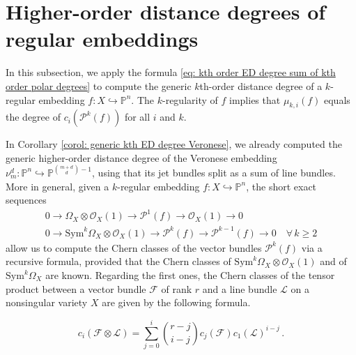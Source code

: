 \documentclass[11pt,reqno]{amsart}
\numberwithin{equation}{section}
\theoremstyle{plain}
\numberwithin{theorem}{section}
\theoremstyle{definition}
\renewcommand{\P}{\mathbb{P}}
\newcommand{\LL}{\mathcal{L}}
\newcommand{\FF}{\mathcal{F}}
\newcommand{\OO}{\mathcal{O}}
\newcommand{\PP}{\mathcal{P}}
\begin{document}
\section{Higher-order distance degrees of regular embeddings}\label{sec: formulas for k-regular embeddings}

In this subsection, we apply the formula \eqref{eq: kth order ED degree sum of kth order polar degrees} to compute the generic $k$th-order distance degree of a $k$-regular embedding $f\colon X\hookrightarrow\P^n$. The $k$-regularity of $f$ implies that $\mu_{k,i}(f)$ equals the degree of $c_i(\PP^k(f))$ for all $i$ and $k$.

In Corollary \ref{corol: generic kth ED degree Veronese}, we already computed the generic higher-order distance degree of the Veronese embedding $\nu_m^d\colon\P^n\hookrightarrow\P^{\binom{m+d}{d}-1}$, using that its jet bundles split as a sum of line bundles. More in general, given a $k$-regular embedding $f\colon X\hookrightarrow\P^n$, the short exact sequences
\begin{equation}\label{eq: two short exact sequences}
\begin{gathered}
    0\to \Omega_X\otimes\OO_X(1) \longrightarrow \PP^1(f) \longrightarrow \OO_X(1) \to 0\\
    0\to \mathrm{Sym}^k\Omega_X\otimes\OO_X(1) \longrightarrow \PP^k(f) \longrightarrow \PP^{k-1}(f) \to 0\quad\forall\,k\ge 2
\end{gathered}
\end{equation}
allow us to compute the Chern classes of the vector bundles $\PP^k(f)$ via a recursive formula, provided that the Chern classes of $\mathrm{Sym}^k\Omega_X\otimes\OO_X(1)$ and of $\mathrm{Sym}^k\Omega_X$ are known. Regarding the first ones, the Chern classes of the tensor product between a vector bundle $\FF$ of rank $r$ and a line bundle $\LL$ on a nonsingular variety $X$ are given by the following formula.

\begin{equation}\label{lem: chern classes tensor product with line bundle}
c_i(\FF\otimes\LL) = \sum_{j=0}^i\binom{r-j}{i-j}c_j(\FF)c_1(\LL)^{i-j}\,.
\end{equation}
\end{document}
